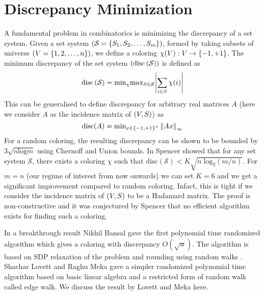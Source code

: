 \section{Discrepancy Minimization}
A fundamental problem in combinatorics is minimizing the discrepancy of a set system. 
Given a set system $\left(\mathcal{S} = \left\{S_1,S_2,\hdots,S_m\right\} \right )$, formed by taking subsets of universe $\left(V = \left\{1,2,\hdots,n\right\} \right )$, we define a coloring $\chi(V) : V \to \left\{-1,+1\right\}$.
The minimum discrepancy of the set system $\left(\text{disc}\left(\mathcal{S} \right ) \right )$ is defined as 
\[ \text{disc}\left(\mathcal{S} \right ) = \text{min}_{\chi}\text{max}_{S \in \mathcal{S}}{\left\lvert \sum_{i \in S}{\chi(i)} \right\rvert} \]
This can be generalised to define discrepancy for arbitrary real matrices $A$ (here we consider $A$ as the incidence matrix of $\left(V,S \right )$) as 
\[ \text{disc}(A) = \text{min}_{x \in \left\{-1,+1\right\}^n} \left\lVert Ax \right\rVert_{\infty}\]
For a random coloring, the resulting discrepancy can be shown to be bounded by $3\sqrt{n\text{log}m}$ using Chernoff and Union bounds.
In \cite{Spencer1985} Spencer showed that for any set system $\mathcal{S}$, there exists a coloring $\chi$ such that $\text{disc}(\mathcal{S}) < K\sqrt{n\;\text{log}_2{(m/n)}}$.
For $m=n$ (our regime of interest from now onwards) we can set $K=6$ and we get a significant improvement compared to random coloring. 
Infact, this is tight if we consider the incidence matrix of $\left(V,S \right )$ to be a Hadamard matrix. The proof is non-constructive and it was conjectured by Spencer that no efficient algorithm exists for finding such a coloring. 

In a breakthrough result \cite{bansal10cadm} Nikhil Bansal gave the first polynomial time randomized algorithm which gives a coloring with discrepancy $O(\sqrt{n})$.
The algorithm is based on SDP relaxation of the problem and rounding using random walks .
Shachar Lovett and Raghu Meka \cite{12lovettmeka} gave a simpler randomized polynomial time algorithm based on basic linear algebra and a restricted form of random walk called edge walk.
We discuss the result by Lovett and Meka here.

